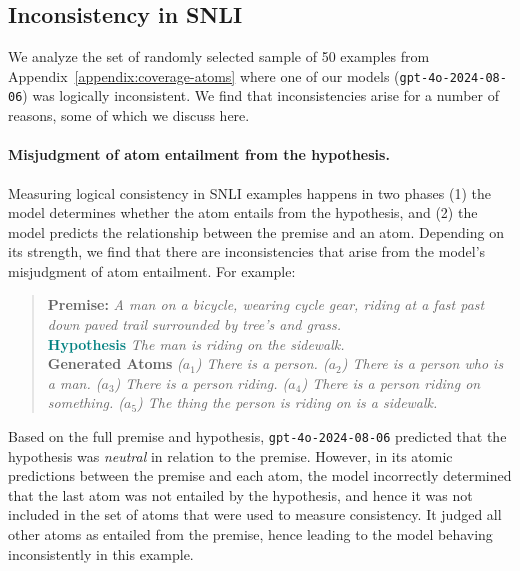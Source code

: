 \subsection{Inconsistency in SNLI}
\label{appendix:inconsistency-analysis}
We analyze the set of randomly selected sample of 50 examples from Appendix~\ref{appendix:coverage-atoms} where one of our models (\texttt{gpt-4o-2024-08-06}) was logically inconsistent.
%
We find that inconsistencies arise for a number of reasons, some of which we discuss here.

\paragraph{Misjudgment of atom entailment from the hypothesis.} Measuring logical consistency in SNLI examples happens in two phases (1) the model determines whether the atom entails from the hypothesis, and (2) the model predicts the relationship between the premise and an atom. Depending on its strength, we find that there are inconsistencies that arise from the model’s misjudgment of atom entailment.
%
For example: 

\begingroup
\addtolength\leftmargini{-0.2in}
\begin{quote}
\small

\noindent \colorbox{lightpurple}{\textcolor{darkpurple}{\textbf{Premise:}}} \textit{A man on a bicycle, wearing cycle gear, riding at a fast past down paved trail surrounded by tree's and grass.} \\ 
            \colorbox{lightteal}{\textcolor{teal}{\textbf{Hypothesis}}} \textit{The man is riding on the sidewalk.}\\
            \colorbox{lightorange}{\textcolor{burntorange}{\textbf{Generated Atoms}}} \textit{($a_1$) There is a person. ($a_2$) There is a person who is a man.
 ($a_3$) There is a person riding. ($a_4$) There is a person riding on something. ($a_5$) The thing the person is riding on is a sidewalk.}
\end{quote}
\endgroup

 \noindent Based on the full premise and hypothesis, \texttt{gpt-4o-2024-08-06} predicted that the hypothesis was \textit{neutral} in relation to the premise. 
 However, in its atomic predictions between the premise and each atom, the model incorrectly determined that the last atom was not entailed by the hypothesis, and hence it was not included in the set of atoms that were used to measure consistency. It judged all other atoms as entailed from the premise, hence leading to the model behaving inconsistently in this example.


